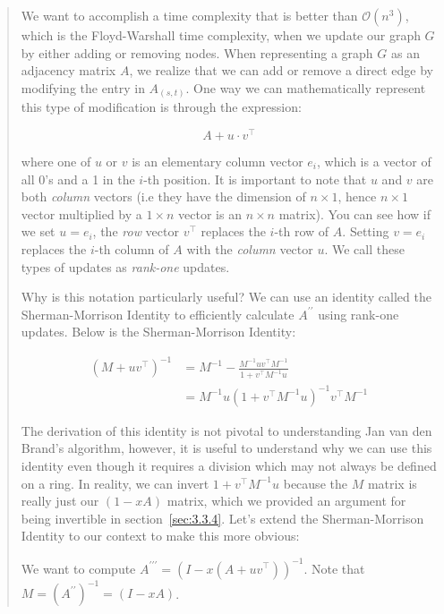\documentclass[12pt]{article}
\newcommand{\bigO}{\mathcal{O}}
\begin{document}
\begin{quote}
    We want to accomplish a time complexity that is better than $\bigO(n^3)$, which is the Floyd-Warshall time complexity, when we update our graph $G$ by either adding or removing nodes. When representing a graph $G$ as an adjacency matrix $A$, we realize that we can add or remove a direct edge by modifying the entry in $A_{(s, t)}$. One way we can mathematically represent this type of modification is through the expression:

    \[
        A + u \cdot v^{\top}
    \]

    where one of $u$ or $v$ is an elementary column vector $e_i$, which is a vector of all 0's and a 1 in the $i$-th position. It is important to note that $u$ and $v$ are both \emph{column} vectors (i.e they have the dimension of $n \times 1$, hence $n \times 1$ vector multiplied by a $1 \times n$ vector is an $n \times n$ matrix). You can see how if we set $u = e_i$, the \emph{row} vector $v^{\top}$ replaces the $i$-th row of $A$. Setting $v = e_i$ replaces the $i$-th column of $A$ with the \emph{column} vector $u$. We call these types of updates as \emph{rank-one} updates.

    Why is this notation particularly useful? We can use an identity called the Sherman-Morrison Identity to efficiently calculate $A^{\prime \prime}$ using rank-one updates. Below is the Sherman-Morrison Identity:

    \[
        \begin{split}
            (M + u v^{\top})^{-1} &= M^{-1} - \frac{M^{-1} u v^{\top} M^{-1}}{1 + v^{\top} M^{-1} u} \\
            &= M^{-1} u (1 + v^{\top} M^{-1} u)^{-1} v^{\top} M^{-1}
        \end{split}
    \]

    The derivation of this identity is not pivotal to understanding Jan van den Brand's algorithm, however, it is useful to understand why we can use this identity even though it requires a division which may not always be defined on a ring. In reality, we can invert $1 + v^{\top} M^{-1} u$ because the $M$ matrix is really just our $(1 - xA)$ matrix, which we provided an argument for being invertible in section~\ref{sec:3.3.4}. Let's extend the Sherman-Morrison Identity to our context to make this more obvious:

    We want to compute $A^{\prime \prime \prime} = (I - x(A + u v^{\top}))^{-1}$. Note that $M = (A^{\prime \prime})^{-1} = (I - xA)$.


\end{quote}
\end{document}
